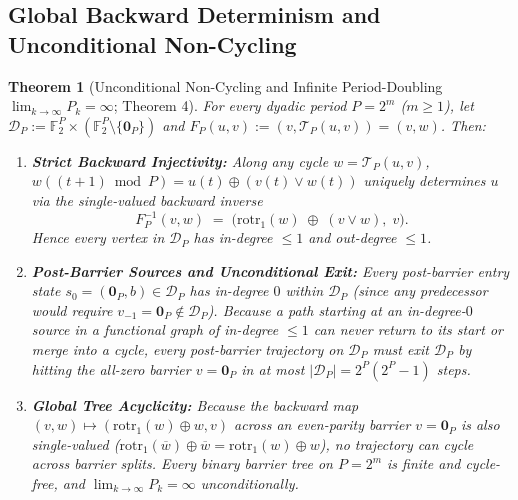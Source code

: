 \documentclass[11pt,a4paper]{article}
\newtheorem{theorem}{Theorem}[section]
\theoremstyle{definition}
\theoremstyle{remark}
\newcommand{\Ftwo}{\mathbb{F}_2}
\newcommand{\rotr}{\mathrm{rotr}}
\begin{document}
\subsection{Global Backward Determinism and Unconditional Non-Cycling}

\begin{theorem}[Unconditional Non-Cycling and Infinite Period-Doubling $\lim_{k\to\infty} P_k = \infty$; Theorem 4]\label{thm:non_cycling}
For every dyadic period $P = 2^m$ ($m \ge 1$), let $\mathcal{D}_P := \Ftwo^P \times (\Ftwo^P \setminus \{\mathbf{0}_P\})$ and $F_P(u,v) := (v, \mathcal{T}_P(u,v)) = (v,w)$. Then:
\begin{enumerate}
  \item \textbf{Strict Backward Injectivity:} Along any cycle $w = \mathcal{T}_P(u,v)$, $w((t+1)\bmod P) = u(t) \oplus (v(t) \lor w(t))$ uniquely determines $u$ via the single-valued backward inverse
  \begin{equation}
    F_P^{-1}(v, w) \;=\; \bigl(\rotr_1(w) \;\oplus\; (v \lor w),\; v\bigr).
  \end{equation}
  Hence every vertex in $\mathcal{D}_P$ has in-degree $\le 1$ and out-degree $\le 1$.
  \item \textbf{Post-Barrier Sources and Unconditional Exit:} Every post-barrier entry state $s_0 = (\mathbf{0}_P, b) \in \mathcal{D}_P$ has in-degree $0$ within $\mathcal{D}_P$ (since any predecessor would require $v_{-1} = \mathbf{0}_P \notin \mathcal{D}_P$). Because a path starting at an in-degree-$0$ source in a functional graph of in-degree $\le 1$ can never return to its start or merge into a cycle, every post-barrier trajectory on $\mathcal{D}_P$ must exit $\mathcal{D}_P$ by hitting the all-zero barrier $v = \mathbf{0}_P$ in at most $|\mathcal{D}_P| = 2^P(2^P - 1)$ steps.
  \item \textbf{Global Tree Acyclicity:} Because the backward map $(v,w) \mapsto (\rotr_1(w) \oplus w, v)$ across an even-parity barrier $v = \mathbf{0}_P$ is also single-valued ($\rotr_1(\overline{w}) \oplus \overline{w} = \rotr_1(w) \oplus w$), no trajectory can cycle across barrier splits. Every binary barrier tree on $P = 2^m$ is finite and cycle-free, and $\lim_{k\to\infty} P_k = \infty$ unconditionally.
\end{enumerate}
\end{theorem}
\end{document}

